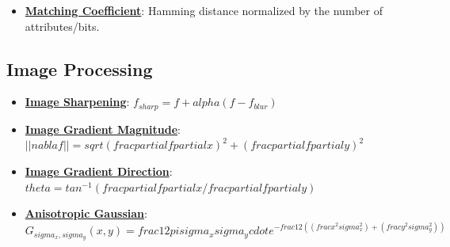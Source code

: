 \documentclass{article}%
\begin{document}
\begin{itemize}[leftmargin=*]
\item \href{https://purdue.brightspace.com/d2l/common/assets/pdfjs-d2l-dist/1.0.14-legacy/web/viewer.html?file=\%2Fcontent\%2Fenforced\%2F1095467-wl.202510.CS.24300.001\%2F12L2-distance-clusters.pdf\%3Fou\%3D1095467\&lang=en-us\&container=d2l-fileviewer-rendered-pdf\&fullscreen=d2l-fileviewer-rendered-pdf-dialog\&height=667#page=19}{\textbf{Matching Coefficient}}: Hamming distance normalized by the number of attributes/bits.%
\end{itemize}

%
\subsection{Image Processing}%
\label{subsec:ImageProcessing}%
\begin{itemize}[leftmargin=*]%
\item \href{https://purdue.brightspace.com/d2l/common/assets/pdfjs-d2l-dist/1.0.14-legacy/web/viewer.html?file=\%2Fcontent\%2Fenforced\%2F1095467-wl.202510.CS.24300.001\%2F07L2-Vision.pdf\%3Fou\%3D1095467\&lang=en-us\&container=d2l-fileviewer-rendered-pdf\&fullscreen=d2l-fileviewer-rendered-pdf-dialog\&height=667#page=55}{\textbf{Image Sharpening}}: $f_{sharp} = f +  alpha(f - f_{blur})$%
\item \href{https://purdue.brightspace.com/d2l/common/assets/pdfjs-d2l-dist/1.0.14-legacy/web/viewer.html?file=\%2Fcontent\%2Fenforced\%2F1095467-wl.202510.CS.24300.001\%2F08L2-Feature Extraction.pdf\%3Fou\%3D1095467\&lang=en-us\&container=d2l-fileviewer-rendered-pdf\&fullscreen=d2l-fileviewer-rendered-pdf-dialog\&height=667#page=17}{\textbf{Image Gradient Magnitude}}: $|| nabla f|| =  sqrt{( frac{ partial f}{ partial x})^2 + ( frac{ partial f}{ partial y})^2}$%
\item \href{https://purdue.brightspace.com/d2l/common/assets/pdfjs-d2l-dist/1.0.14-legacy/web/viewer.html?file=\%2Fcontent\%2Fenforced\%2F1095467-wl.202510.CS.24300.001\%2F08L2-Feature Extraction.pdf\%3Fou\%3D1095467\&lang=en-us\&container=d2l-fileviewer-rendered-pdf\&fullscreen=d2l-fileviewer-rendered-pdf-dialog\&height=667#page=34}{\textbf{Image Gradient Direction}}: $ theta =  tan^{-1}( frac{ partial f}{ partial x} /  frac{ partial f}{ partial y})$%
\item \href{https://purdue.brightspace.com/d2l/common/assets/pdfjs-d2l-dist/1.0.14-legacy/web/viewer.html?file=\%2Fcontent\%2Fenforced\%2F1095467-wl.202510.CS.24300.001\%2F08L2-Feature Extraction.pdf\%3Fou\%3D1095467\&lang=en-us\&container=d2l-fileviewer-rendered-pdf\&fullscreen=d2l-fileviewer-rendered-pdf-dialog\&height=667#page=43}{\textbf{Anisotropic Gaussian}}: $G_{ sigma_x,  sigma_y}(x, y) =  frac{1}{2 pi sigma_x sigma_y}  cdot e^{- frac{1}{2}(( frac{x^2}{ sigma_x^2}) + ( frac{y^2}{ sigma_y^2}))}$%

\end{itemize}
\end{document}
